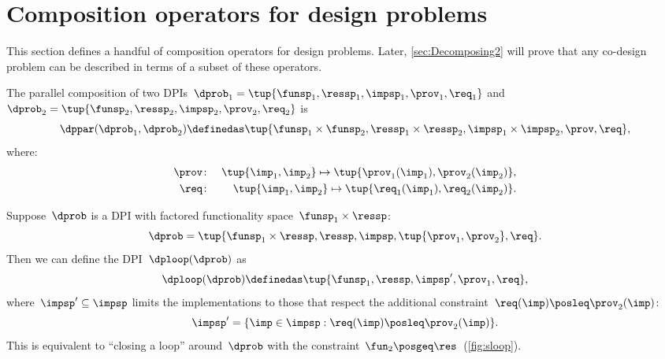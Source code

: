 \section{Composition operators for design problems}

This section defines a handful of composition operators for design
problems. Later, \cref{sec:Decomposing2} will prove that any co-design
problem can be described in terms of a subset of these operators.

\label{sec:threeoperators}

\begin{definition}[$\dppar$]
  \label{def:parallel}
  The parallel composition of two DPIs~$\dprob_{1}=\tup{\funsp_{1},\ressp_{1},\impsp_{1},\prov_{1},\req_{1}}$
  and~$\dprob_{2}=\tup{\funsp_{2},\ressp_{2},\impsp_{2},\prov_{2},
  \req_{2}}$ is
  \begin{equation*}
    \dppar(\dprob_{1},\dprob_{2})\definedas\tup{\funsp_{1}\times\funsp_{2},\ressp_{1}\times\ressp_{2},\impsp_{1}\times\impsp_{2},\prov,\req} ,
  \end{equation*}
  where:
  \begin{eqnarray}
    \prov & \colon & \tup{ \imp_{1},\imp_{2}} \mapsto \tup{\prov_{1}(\imp_{1}),\prov_{2}(\imp_{2})} ,\label{eq:dppar-exec}\\
    \req & \colon & \tup{ \imp_{1},\imp_{2}}\mapsto\tup{\req_{1}(\imp_{1}),\req_{2}(\imp_{2})} .\nonumber
  \end{eqnarray}

\end{definition}


\begin{definition}[$\dploop$]
  \label{def:dp_loop}Suppose~$\dprob$ is a DPI with factored functionality
  space~$\funsp_{1}\times\ressp$:
  \begin{equation*}
    \dprob=\tup{ \funsp_{1}\times\ressp,\ressp,\impsp,\tup{ \prov_{1},\prov_{2}} ,\req}.
  \end{equation*}
  Then we can define the DPI~$\dploop(\dprob)$ as
  \begin{equation*}
    \dploop(\dprob)\definedas\tup{ \funsp_{1},\ressp,\impsp',\prov_{1},\req} ,
  \end{equation*}
  where~$\impsp'\subseteq\impsp$ limits the implementations to those
  that respect the additional constraint~$\req(\imp)\posleq\prov_{2}(\imp)$:
  \begin{equation*}
    \impsp'=\{\imp\in\impsp:\req(\imp)\posleq\prov_{2}(\imp)\}.
  \end{equation*}
  This is equivalent to ``closing a loop'' around~$\dprob$ with
  the constraint~$\fun_{2}\posgeq\res$~(\cref{fig:sloop}).
\end{definition}

